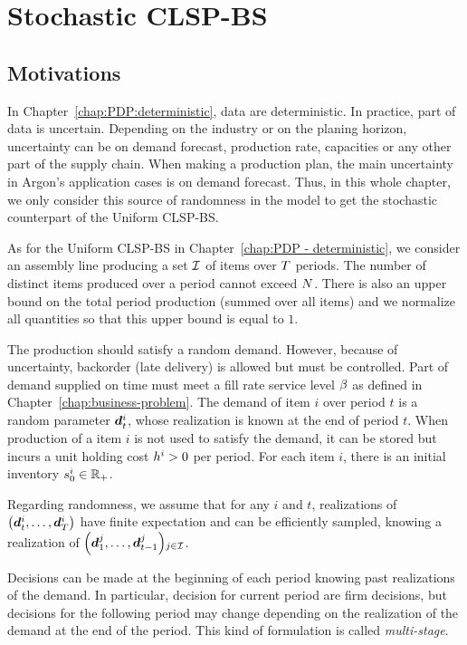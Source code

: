 \chapter{Stochastic CLSP-BS}
\label{chap:PDP:stochastic}

\section{Motivations}


In Chapter~\ref{chap:PDP:deterministic}, data are deterministic. In practice, part of data is uncertain. Depending on the industry or on the planing horizon, uncertainty can be on demand forecast, production rate, capacities or any other part of the supply chain. When making a production plan, the main uncertainty in Argon's application cases is on demand forecast. Thus, in this whole chapter, we only consider this source of randomness in the model to get the stochastic counterpart of the Uniform CLSP-BS.


As for the Uniform CLSP-BS in Chapter~\ref{chap:PDP - deterministic}, we consider an assembly line producing a set $\mathcal{I}$ of items over $T$ periods. The number of distinct items produced over a period cannot exceed $N$. There is also an upper bound on the total period production (summed over all items) and we normalize all quantities so that this upper bound is equal to $1$.

The production should satisfy a random demand. However, because of uncertainty, backorder (\ie late delivery) is allowed but must be controlled. Part of demand supplied on time must meet a fill rate service level $\beta$ as defined in Chapter~\ref{chap:business-problem}. The demand of item $i$ over period $t$ is a random parameter $\va\demand_t^i$, whose realization is known at the end of period $t$. When production of a item $i$ is not used to satisfy the demand, it can be stored but incurs a unit holding cost $h^i>0$ per period. For each item $i$, there is an initial inventory $s_0^i\in\mathbb{R}_+$.

Regarding randomness, we assume that for any $i$ and $t$, realizations of $\bracket{\va\demand_t^i,\ldots,\va\demand_{\horizon}^i}$ have finite expectation and can be efficiently sampled, knowing a realization of $\bracket{\va\demand_1^j,\ldots,\va\demand_{t-1}^j}_{j\in\REF}$.

Decisions can be made at the beginning of each period knowing past realizations of the demand. In particular, decision for current period are firm decisions, but decisions for the following period may change depending on the realization of the demand at the end of the period. This kind of formulation is called \emph{multi-stage}.

